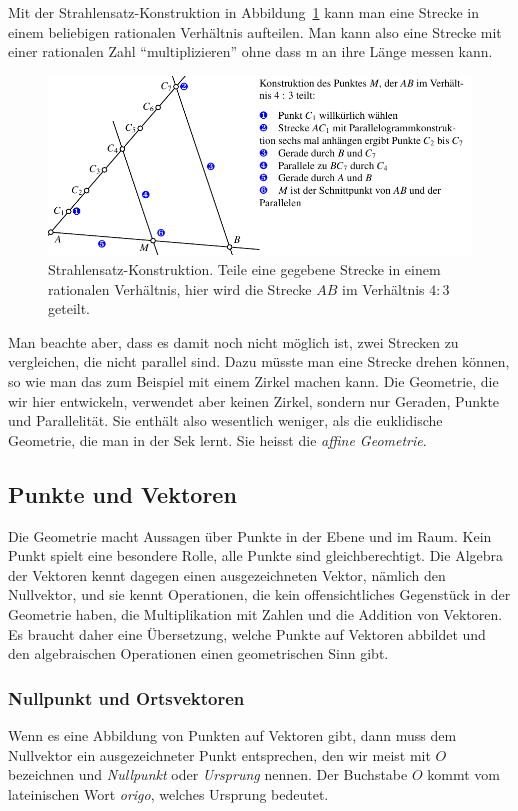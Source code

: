 Mit der Strahlensatz-Konstruktion in
Abbildung~\ref{skript:affin:strahlensatz}
kann man eine Strecke in einem beliebigen rationalen Verhältnis aufteilen.
Man kann also eine Strecke mit einer rationalen Zahl ``multiplizieren''
ohne dass m an ihre Länge messen kann.
\begin{figure}
\centering
\includegraphics{3/images/strahlensatz.pdf}
\caption{Strahlensatz-Konstruktion. 
Teile eine gegebene Strecke in einem rationalen Verhältnis, hier wird
die Strecke $AB$ im Verhältnis $4:3$ geteilt.
\label{skript:affin:strahlensatz}}
\end{figure}

Man beachte aber, dass es damit noch nicht möglich ist, zwei Strecken
zu vergleichen, die nicht parallel sind.
Dazu müsste man eine Strecke drehen können, so wie man das zum Beispiel
mit einem Zirkel machen kann.
Die Geometrie, die wir hier entwickeln, verwendet aber keinen Zirkel,
sondern nur Geraden, Punkte und Parallelität.
Sie enthält also wesentlich weniger, als die euklidische Geometrie, die
man in der Sek lernt.
Sie heisst die {\em affine Geometrie}.

%
%
\subsection{Punkte und Vektoren}
Die Geometrie macht Aussagen über Punkte in der Ebene und im Raum.
Kein Punkt spielt eine besondere Rolle, alle Punkte sind gleichberechtigt.
Die Algebra der Vektoren kennt dagegen einen ausgezeichneten Vektor,
nämlich den Nullvektor, und sie kennt Operationen, die kein offensichtliches
Gegenstück in der Geometrie haben, die Multiplikation mit Zahlen und
die Addition von Vektoren.
Es braucht daher eine Übersetzung, welche Punkte auf Vektoren
abbildet und den algebraischen Operationen einen geometrischen
Sinn gibt.

\subsubsection{Nullpunkt und Ortsvektoren}
Wenn es eine Abbildung von Punkten auf Vektoren gibt, dann muss dem
Nullvektor ein ausgezeichneter Punkt entsprechen, den wir meist mit 
$O$ bezeichnen und {\em Nullpunkt} oder {\em Ursprung} nennen.
Der Buchstabe $O$ kommt vom lateinischen Wort {\it origo}, welches
Ursprung bedeutet.

